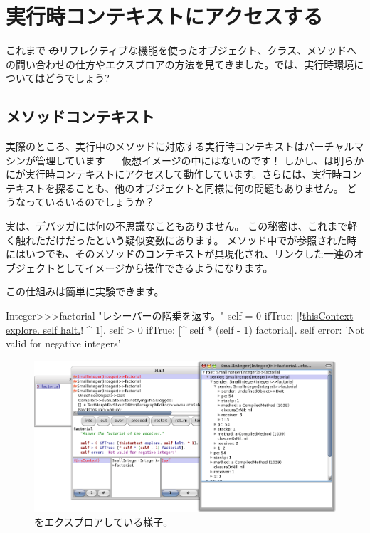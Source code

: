 \documentclass[a4paper,10pt,twoside]{book}
\begin{document}
\section{実行時コンテキストにアクセスする}

これまで \st のリフレクティブな機能を使ったオブジェクト、クラス、メソッドへの問い合わせの仕方やエクスプロアの方法を見てきました。では、実行時環境についてはどうでしょう?

\subsection{メソッドコンテキスト}

実際のところ、実行中のメソッドに対応する実行時コンテキストはバーチャルマシンが管理しています --- 仮想イメージの中にはないのです！
しかし、は明らかにが実行時コンテキストにアクセスして動作しています。さらには、実行時コンテキストを探ることも、他のオブジェクトと同様に何の問題もありません。
どうなっているいるのでしょうか？

実は、デバッガには何の不思議なこともありません。
この秘密は、これまで軽く触れただけだったという疑似変数にあります。
メソッド中でが参照された時にはいつでも、そのメソッドのコンテキストが具現化され、リンクした一連のオブジェクトとしてイメージから操作できるようになります。

この仕組みは簡単に実験できます。


\begin{code}{}
Integer>>>factorial
	"レシーバーの階乗を返す。"
	self = 0 ifTrue: [!\underline{thisContext explore. self halt.}! ^ 1].
	self > 0 ifTrue: [^ self * (self - 1) factorial].
	self error: 'Not valid for negative integers'
\end{code}


\begin{figure}[ht]\centering
	\includegraphics[width=\linewidth]{exploringThisContext}
	\caption{をエクスプロアしている様子。}
\end{figure}
\end{document}
